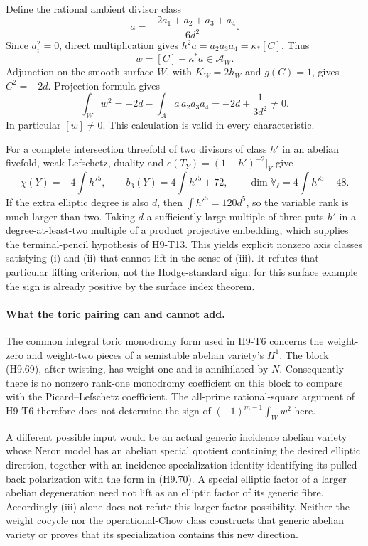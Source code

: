 Define the rational ambient divisor class
\[
 a=\frac{-2a_1+a_2+a_3+a_4}{6d^2}.
\]
Since $a_i^2=0$, direct multiplication gives
$h^2a=a_2a_3a_4=\kappa_*[C]$. Thus
\[
                 w=[C]-\kappa^*a\in\mathcal A_W.
\]
Adjunction on the smooth surface $W$, with $K_W=2h_W$ and
$g(C)=1$, gives $C^2=-2d$. Projection formula gives
\[
 \int_Ww^2
   =-2d-\int_Aa\,a_2a_3a_4
   =-2d+\frac1{3d^2}\ne0.                                 \tag{H9.75}
\]
In particular $[w]\ne0$. This calculation is valid in every
characteristic.

For a complete intersection threefold of two divisors of class
$h'$ in an abelian fivefold, weak Lefschetz, duality and
$c(T_Y)=(1+h')^{-2}|_Y$ give
\[
 \chi(Y)=-4\int h'^5,\qquad
 b_3(Y)=4\int h'^5+72,\qquad
 \dim\mathbb V_\ell=4\int h'^5-48.                          \tag{H9.76}
\]
If the extra elliptic degree is also $d$, then
$\int h'^5=120d^5$, so the variable rank is much larger than two.
Taking $d$ a sufficiently large multiple of three puts $h'$ in a
degree-at-least-two multiple of a product projective embedding,
which supplies the terminal-pencil hypothesis of H9-T13.
This yields explicit nonzero axis classes satisfying (i) and (ii)
that cannot lift in the sense of (iii). It refutes that particular
lifting criterion, not the Hodge-standard sign: for this surface
example the sign is already positive by the surface index theorem.

\paragraph{What the toric pairing can and cannot add.}
The common integral toric monodromy form used in H9-T6 concerns the
weight-zero and weight-two pieces of a semistable abelian variety's
$H^1$. The block (H9.69), after twisting, has weight one and is
annihilated by $N$. Consequently there is no nonzero rank-one
monodromy coefficient on this block to compare with the
Picard--Lefschetz coefficient. The all-prime rational-square
argument of H9-T6 therefore does not determine the sign of
$(-1)^{m-1}\int_Ww^2$ here.

A different possible input would be an actual generic incidence
abelian variety whose Neron model has an abelian special quotient
containing the desired elliptic direction, together with an
incidence-specialization identity identifying its pulled-back
polarization with the form in (H9.70). A special elliptic factor of
a larger abelian degeneration need not lift as an elliptic factor
of its generic fibre. Accordingly (iii) alone does not refute this
larger-factor possibility. Neither the weight cocycle nor the
operational-Chow class constructs that generic abelian variety
or proves that its specialization contains this new direction.

